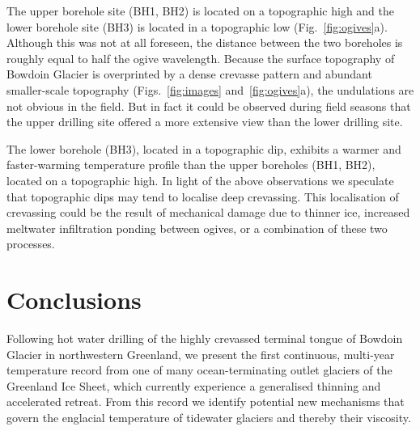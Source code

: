 \documentclass[utf8]{article}
\begin{document}
    The upper borehole site (BH1, BH2) is located on a topographic high and the
    lower borehole site (BH3) is located in a topographic low
    (Fig.~\ref{fig:ogives}a). Although this
    was not at all foreseen, the distance between the two boreholes is roughly
    equal to half the ogive wavelength. Because the surface topography of
    Bowdoin Glacier is overprinted by a dense crevasse pattern and abundant
    smaller-scale topography (Figs.~\ref{fig:images} and~\ref{fig:ogives}a),
    the undulations are not obvious in the field. But in fact it
    could be observed during field seasons that the upper drilling site offered
    a more extensive view than the lower drilling site.

    The lower borehole (BH3), located in a topographic dip, exhibits a warmer
    and faster-warming temperature profile than the upper boreholes (BH1, BH2),
    located on a topographic high. In light of the above observations we
    speculate that topographic dips may tend to localise deep
    crevassing. This localisation of crevassing
    could be the result of mechanical damage due to thinner ice, increased
    meltwater infiltration ponding between ogives, or a combination of these
    two processes.


\section{Conclusions}

    Following hot water drilling of the highly crevassed terminal tongue of
    Bowdoin Glacier in northwestern Greenland, we present the first continuous,
    multi-year temperature record from one of many ocean-terminating outlet
    glaciers of the Greenland Ice Sheet, which currently experience a
    generalised thinning and accelerated retreat. From this record we identify
    potential new mechanisms that govern the englacial temperature of tidewater
    glaciers and thereby their viscosity.
\end{document}
